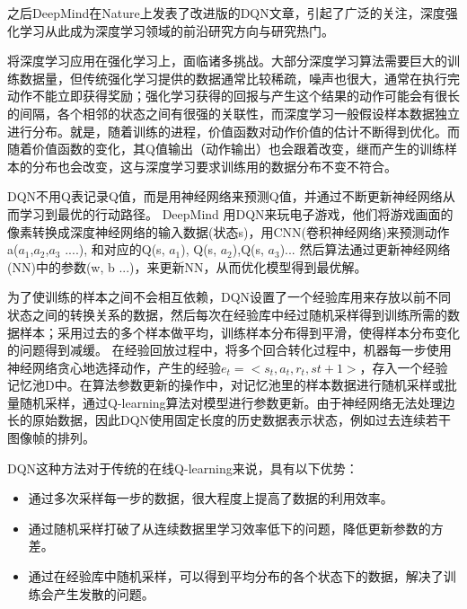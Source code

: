 之后DeepMind在Nature上发表了改进版的DQN文章\cite{mnih2015human}，引起了广泛的关注，深度强化学习从此成为深度学习领域的前沿研究方向与研究热门。

将深度学习应用在强化学习上，面临诸多挑战。大部分深度学习算法需要巨大的训练数据量，但传统强化学习提供的数据通常比较稀疏，噪声也很大，通常在执行完动作不能立即获得奖励；强化学习获得的回报与产生这个结果的动作可能会有很长的间隔，各个相邻的状态之间有很强的关联性，而深度学习一般假设样本数据独立进行分布。就是，随着训练的进程，价值函数对动作价值的估计不断得到优化。而随着价值函数的变化，其Q值输出（动作输出）也会跟着改变，继而产生的训练样本的分布也会改变，这与深度学习要求训练用的数据分布不变不符合。

DQN不用Q表记录Q值，而是用神经网络来预测Q值，并通过不断更新神经网络从而学习到最优的行动路径。
DeepMind 用DQN来玩电子游戏，他们将游戏画面的像素转换成深度神经网络的输入数据(状态s)，用CNN(卷积神经网络)来预测动作a($a_1$,$a_2$,$a_3$ ....), 和对应的Q(s, $a_1$), Q(s, $a_2$),Q(s, $a_3$)...
然后算法通过更新神经网络(NN)中的参数(w, b ...)，来更新NN，从而优化模型得到最优解。

为了使训练的样本之间不会相互依赖，DQN设置了一个经验库用来存放以前不同状态之间的转换关系的数据，然后每次在经验库中经过随机采样得到训练所需的数据样本；采用过去的多个样本做平均，训练样本分布得到平滑，使得样本分布变化的问题得到减缓。
在经验回放过程中，将多个回合转化过程中，机器每一步使用神经网络贪心地选择动作，产生的经验$e_t = <s_t, a_t, r_t, st+1>$，存入一个经验记忆池D中。在算法参数更新的操作中，对记忆池里的样本数据进行随机采样或批量随机采样，通过Q-learning算法对模型进行参数更新。由于神经网络无法处理边长的原始数据，因此DQN使用固定长度的历史数据表示状态，例如过去连续若干图像帧的排列。

DQN这种方法对于传统的在线Q-learning来说，具有以下优势：
\begin{itemize}
  \item 通过多次采样每一步的数据，很大程度上提高了数据的利用效率。
  \item 通过随机采样打破了从连续数据里学习效率低下的问题，降低更新参数的方差。
  \item 通过在经验库中随机采样，可以得到平均分布的各个状态下的数据，解决了训练会产生发散的问题。
\end{itemize}

